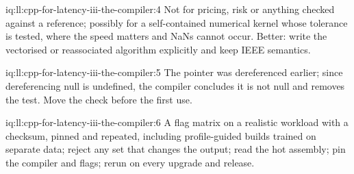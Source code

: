 \begin{solution}{iq:ll:cpp-for-latency-iii-the-compiler:4}
Not for pricing, risk or anything checked against a reference; possibly for a self-contained numerical kernel whose
tolerance is tested, where the speed matters and NaNs cannot occur. Better: write the vectorised or reassociated algorithm
explicitly and keep IEEE semantics.
\end{solution}

\begin{solution}{iq:ll:cpp-for-latency-iii-the-compiler:5}
The pointer was dereferenced earlier; since dereferencing null is undefined, the compiler concludes it is not null and
removes the test. Move the check before the first use.
\end{solution}

\begin{solution}{iq:ll:cpp-for-latency-iii-the-compiler:6}
A flag matrix on a realistic workload with a checksum, pinned and repeated, including profile-guided builds trained on
separate data; reject any set that changes the output; read the hot assembly; pin the compiler and flags; rerun on every
upgrade and release.
\end{solution}
